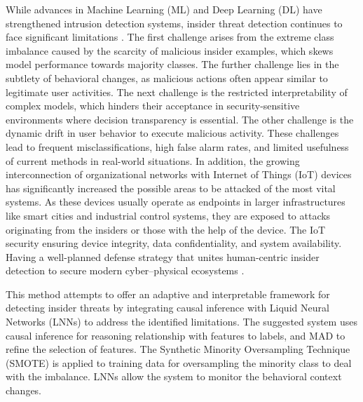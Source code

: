 While advances in Machine Learning (ML) and Deep Learning (DL) have strengthened intrusion detection systems, insider threat detection continues to face significant limitations \cite{alzaabi2024review,gonzales2024towards}. The first challenge arises from the extreme class imbalance caused by the scarcity of malicious insider examples, which skews model performance towards majority classes. The further challenge lies in the subtlety of behavioral changes, as malicious actions often appear similar to legitimate user activities. The next challenge is the restricted interpretability of complex models, which hinders their acceptance in security-sensitive environments where decision transparency is essential. The other challenge is the dynamic drift in user behavior to execute malicious activity. These challenges lead to frequent misclassifications, high false alarm rates, and limited usefulness of current methods in real-world situations.
In addition, the growing interconnection of organizational networks with Internet of Things (IoT) devices has significantly increased the possible areas to be attacked of the most vital systems. As these devices usually operate as endpoints in larger infrastructures like smart cities and industrial control systems, they are exposed to attacks originating from the insiders or those with the help of the device. The IoT security ensuring device integrity, data confidentiality, and system availability. Having a well-planned defense strategy that unites human-centric insider detection to secure modern cyber–physical ecosystems \cite{amiri2023federated, 11082266}.

This method attempts to offer an adaptive and interpretable framework for detecting insider threats by integrating causal inference with Liquid Neural Networks (LNNs) to address the identified limitations. The suggested system uses causal inference for reasoning relationship with features to labels, and MAD to refine the selection of features. The Synthetic Minority Oversampling Technique (SMOTE) is applied to training data for oversampling the minority class to deal with the imbalance. LNNs allow the system to monitor the behavioral context changes.


